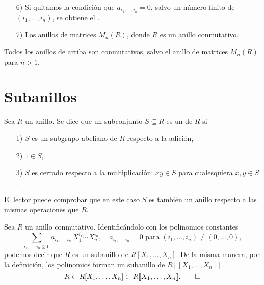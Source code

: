 \begin{enumerate}
\item[6)] Si quitamos la condición que $a_{i_1,\ldots,i_n} = 0$, salvo un número
  finito de $(i_1,\ldots,i_n)$, se obtiene el .

\item[7)] Los anillos de matrices $M_n (R)$, donde $R$ es un anillo conmutativo.
\end{enumerate}

Todos los anillos de arriba son conmutativos, salvo el anillo de matrices
$M_n (R)$ para $n > 1$.


\section{Subanillos}

\begin{definicion}
  Sea $R$ un anillo. Se dice que un subconjunto $S \subseteq R$ es
  un  de $R$ si

  \begin{enumerate}
  \item[1)] $S$ es un subgrupo abeliano de $R$ respecto a la adición,

  \item[2)] $1 \in S$,

  \item[3)] $S$ es cerrado respecto a la multiplicación: $xy\in S$ para
    cualesquiera $x,y\in S$.
  \end{enumerate}
\end{definicion}

El lector puede comprobar que en este caso $S$ es también un anillo respecto
a las mismas operaciones que $R$.

\begin{ejemplo}
  Sea $R$ un anillo conmutativo. Identificándolo con los polinomios constantes
  \[ \sum_{i_1,\ldots,i_n\ge 0} a_{i_1,\ldots,i_n}\,X_1^{i_1}\cdots X_n^{i_n},
     \quad
     a_{i_1,\ldots,i_n} = 0 \text{ para } (i_1,\ldots,i_n) \ne (0,\ldots,0), \]
  podemos decir que $R$ es un subanillo de $R [X_1,\ldots,X_n]$. De la misma
  manera, por la definición, los polinomios forman un subanillo
  de $R [\![X_1,\ldots,X_n]\!]$.
  \[ R \subset R [X_1,\ldots,X_n] \subset R [\![X_1,\ldots,X_n]\!]. \qedhere \]
\end{ejemplo}

